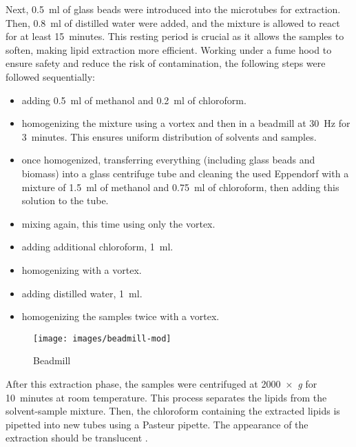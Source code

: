 Next, \qty{0.5}{\milli\litre} of glass beads were introduced into the microtubes for extraction. Then, \qty{0.8}{\milli\litre} of distilled water were added, and the mixture is allowed to react for at least \qty{15}{minutes}. This resting period is crucial as it allows the samples to soften, making lipid extraction more efficient. Working under a fume hood to ensure safety and reduce the risk of contamination, the following steps were followed sequentially:
\begin{itemize}
\item adding \qty{0.5}{\milli\litre} of methanol and \qty{0.2}{\milli\litre} of chloroform.
\item homogenizing the mixture using a vortex and then in a beadmill  at \qty{30}{\hertz} for \qty{3}{minutes}. This ensures uniform distribution of solvents and samples.
\item once homogenized, transferring everything (including glass beads and biomass) into a glass centrifuge tube and cleaning the used Eppendorf with a mixture of \qty{1.5}{\milli\litre} of methanol and \qty{0.75}{\milli\litre} of chloroform, then adding this solution to the tube.
\item mixing again, this time using only the vortex.
\item adding additional chloroform, \qty{1}{\milli\litre}.
\item homogenizing with a vortex.
\item adding distilled water, \qty{1}{\milli\litre}.
\item homogenizing the samples twice with a vortex.
\end{itemize}

\begin{figure}[H]
	\centering
	\texttt{[image: images/beadmill-mod]}
	\caption{Beadmill}
	\label{fig:beadmill}
\end{figure}

After this extraction phase, the samples were centrifuged at 2000~×~\textsl{g}
for \qty{10}{minutes} at room temperature. This process separates the lipids from the solvent-sample mixture. Then, the chloroform containing the extracted lipids is pipetted into new tubes using a Pasteur pipette. The appearance of the extraction should be translucent .

